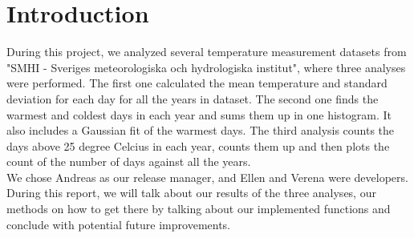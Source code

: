 \section{Introduction}
During this project, we analyzed several temperature measurement datasets from 
"SMHI - Sveriges meteorologiska och hydrologiska institut", where three analyses were performed. 
The first one calculated the mean temperature and standard deviation for each day for all the years in dataset. 
The second one finds the warmest and coldest days in each year and sums them up in one histogram. 
It also includes a Gaussian fit of the warmest days. The third analysis counts the days above 25 degree Celcius 
in each year, counts them up and then plots the count of the number of days against all the years. \\

We chose Andreas as our release manager, and Ellen and Verena were developers. During this report, we will talk about 
our results of the three analyses, our methods on how to get there by talking about our implemented functions and 
conclude with potential future improvements.